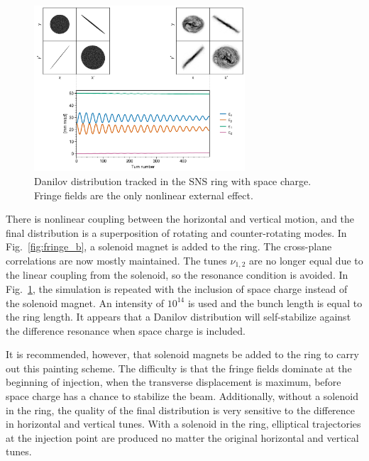 \begin{figure}[!p]
    \centering
    \includegraphics[width=0.7\textwidth]{Images/chapter3/fringe_spacecharge.png}
    \caption{Danilov distribution tracked in the SNS ring with space charge. Fringe fields are the only nonlinear external effect.}
    \label{fig:fringe_c}
    \vspace*{3cm}
\end{figure}

There is nonlinear coupling between the horizontal and vertical motion, and the final distribution is a superposition of rotating and counter-rotating modes. In Fig.~\ref{fig:fringe_b}, a solenoid magnet is added to the ring. The cross-plane correlations are now mostly maintained. The tunes $\nu_{1, 2}$ are no longer equal due to the linear coupling from the solenoid, so the resonance condition is avoided. In Fig.~\ref{fig:fringe_c}, the simulation is repeated with the inclusion of space charge instead of the solenoid magnet. An intensity of $10^{14}$ is used and the bunch length is equal to the ring length. It appears that a Danilov distribution will self-stabilize against the difference resonance when space charge is included.

It is recommended, however, that solenoid magnets be added to the ring to carry out this painting scheme. The difficulty is that the fringe fields dominate at the beginning of injection, when the transverse displacement is maximum, before space charge has a chance to stabilize the beam. Additionally, without a solenoid in the ring, the quality of the final distribution is very sensitive to the difference in horizontal and vertical tunes. With a solenoid in the ring, elliptical trajectories at the injection point are produced no matter the original horizontal and vertical tunes. 